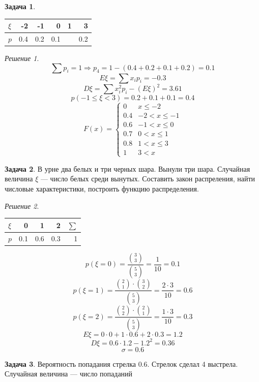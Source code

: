 \documentclass[english]{article}
\theoremstyle{plain}
\theoremstyle{remark}
\newtheorem*{solution}{Решение}
\theoremstyle{definition}
\newtheorem{task}{Задача}
\begin{document}
\begin{task}
\-
\begin{center}
\begin{tabular}{l|rrrrr}
\(\xi\) & -2 & -1 & 0 & 1 & 3\\
\hline
\(p\) & 0.4 & 0.2 & 0.1 &  & 0.2\\
\end{tabular}
\end{center}
\end{task}
\begin{solution}
\[ \sum p_i = 1 \Rightarrow p_4 = 1 - (0.4 + 0.2 + 0.1 + 0.2) = 0.1 \]
\[ E\xi = \sum x_i p_i = -0.3 \]
\[ D\xi = \sum x_i^2p_i - (E\xi)^2 = 3.61 \]
\[ p(-1 \le \xi < 3) = 0.2 + 0.1 + 0.1  = 0.4 \]
\[ F(x) = \begin{cases}
0 & x \le -2 \\
0.4 & -2 < x \le -1 \\
0.6 & -1 < x \le 0 \\
0.7 & 0 < x \le 1 \\
0.8 & 1 < x \le 3 \\
1 & 3 < x
\end{cases} \]
\end{solution}
\begin{task}
В урне два белых и три черных шара. Вынули три шара. Случайная величина \(\xi\) --- число белых среди вынутых. Составить закон распреления, найти числовые характеристики, построить функцию распределения.
\end{task}
\begin{solution}
\-
\begin{center}
\begin{tabular}{l|rrrr}
\(\xi\) & 0 & 1 & 2 & \(\sum\)\\
\hline
\(p\) & 0.1 & 0.6 & 0.3 & 1\\
\end{tabular}
\end{center}
\[ p(\xi = 0) = \frac{\binom{3}{3}}{\binom{5}{3}} = \frac{1}{10} = 0.1 \]
\[ p(\xi = 1) = \frac{\binom{2}{1}\cdot\binom{3}{2}}{\binom{5}{3}} = \frac{2\cdot 3}{10} = 0.6 \]
\[ p(\xi = 2) = \frac{\binom{2}{2}\cdot\binom{2}{1}}{\binom{5}{3}} = \frac{1\cdot 3}{10} = 0.3 \]
\[ E\xi = 0 \cdot 0 + 1 \cdot 0.6 + 2\cdot 0.3 = 1.2 \]
\[ D\xi = 0.6\cdot 1.2 - 1.2^2 = 0.36 \]
\[ \sigma = 0.6 \]
\end{solution}
\begin{task}
Вероятность попадания стрелка \(0.6\). Стрелок сделал 4 выстрела. Случайная величина --- число попаданий
\end{task}
\end{document}
